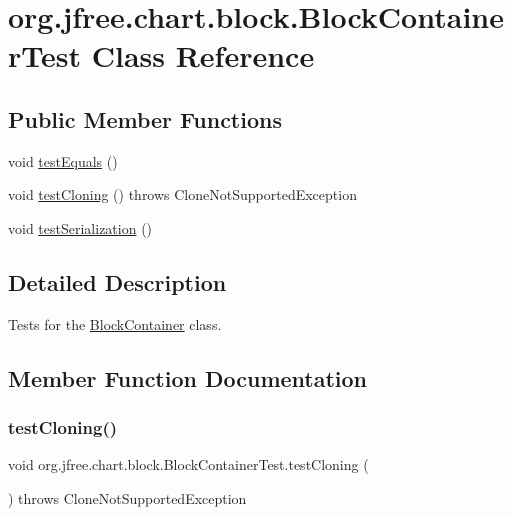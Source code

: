 \hypertarget{classorg_1_1jfree_1_1chart_1_1block_1_1_block_container_test}{}\section{org.\+jfree.\+chart.\+block.\+Block\+Container\+Test Class Reference}
\label{classorg_1_1jfree_1_1chart_1_1block_1_1_block_container_test}
\subsection*{Public Member Functions}
\begin{DoxyCompactItemize}
\item 
void \mbox{\hyperlink{classorg_1_1jfree_1_1chart_1_1block_1_1_block_container_test_ad1e8b79526baca47bc5747b59ee9dac2}{test\+Equals}} ()
\item 
void \mbox{\hyperlink{classorg_1_1jfree_1_1chart_1_1block_1_1_block_container_test_a5efb95e35d6b70a3d4a20b185da296f6}{test\+Cloning}} ()  throws Clone\+Not\+Supported\+Exception 
\item 
void \mbox{\hyperlink{classorg_1_1jfree_1_1chart_1_1block_1_1_block_container_test_abc3b91d9398f426e03f54f04803b3292}{test\+Serialization}} ()
\end{DoxyCompactItemize}


\subsection{Detailed Description}
Tests for the \mbox{\hyperlink{classorg_1_1jfree_1_1chart_1_1block_1_1_block_container}{Block\+Container}} class. 

\subsection{Member Function Documentation}
\mbox{\label{classorg_1_1jfree_1_1chart_1_1block_1_1_block_container_test_a5efb95e35d6b70a3d4a20b185da296f6}} 
\subsubsection{\texorpdfstring{test\+Cloning()}{testCloning()}}
{\footnotesize\ttfamily void org.\+jfree.\+chart.\+block.\+Block\+Container\+Test.\+test\+Cloning (\begin{DoxyParamCaption}{ }\end{DoxyParamCaption}) throws Clone\+Not\+Supported\+Exception}


